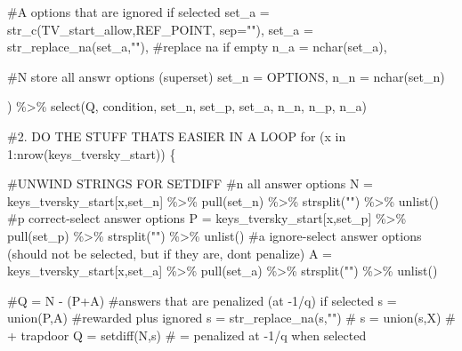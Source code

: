 \documentclass[
  letterpaper,
  DIV=11,
  numbers=noendperiod]{scrreprt}
\newenvironment{Shaded}{\begin{snugshade}}{\end{snugshade}}
\newcommand{\AttributeTok}[1]{\textcolor[rgb]{0.40,0.45,0.13}{#1}}
\newcommand{\CommentTok}[1]{\textcolor[rgb]{0.37,0.37,0.37}{#1}}
\newcommand{\ControlFlowTok}[1]{\textcolor[rgb]{0.00,0.23,0.31}{#1}}
\newcommand{\DecValTok}[1]{\textcolor[rgb]{0.68,0.00,0.00}{#1}}
\newcommand{\FunctionTok}[1]{\textcolor[rgb]{0.28,0.35,0.67}{#1}}
\newcommand{\NormalTok}[1]{\textcolor[rgb]{0.00,0.23,0.31}{#1}}
\newcommand{\OtherTok}[1]{\textcolor[rgb]{0.00,0.23,0.31}{#1}}
\newcommand{\SpecialCharTok}[1]{\textcolor[rgb]{0.37,0.37,0.37}{#1}}
\newcommand{\StringTok}[1]{\textcolor[rgb]{0.13,0.47,0.30}{#1}}
\begin{document}
\begin{Shaded}
\begin{Highlighting}[]
    \CommentTok{\#A options that are ignored if selected }
    \AttributeTok{set\_a =} \FunctionTok{str\_c}\NormalTok{(TV\_start\_allow,REF\_POINT, }\AttributeTok{sep=}\StringTok{""}\NormalTok{),}
    \AttributeTok{set\_a =} \FunctionTok{str\_replace\_na}\NormalTok{(set\_a,}\StringTok{""}\NormalTok{), }\CommentTok{\#replace na if empty}
    \AttributeTok{n\_a =} \FunctionTok{nchar}\NormalTok{(set\_a),}
    
    \CommentTok{\#N store all answr options (superset)}
    \AttributeTok{set\_n =}\NormalTok{ OPTIONS,  }
    \AttributeTok{n\_n =} \FunctionTok{nchar}\NormalTok{(set\_n)}
  
\NormalTok{) }\SpecialCharTok{\%\textgreater{}\%} \FunctionTok{select}\NormalTok{(Q, condition, set\_n, set\_p, set\_a, n\_n, n\_p, n\_a)}

\CommentTok{\#2. DO THE STUFF THAT\textquotesingle{}S EASIER IN A LOOP}
\ControlFlowTok{for}\NormalTok{ (x }\ControlFlowTok{in} \DecValTok{1}\SpecialCharTok{:}\FunctionTok{nrow}\NormalTok{(keys\_tversky\_start)) \{}
  
  \CommentTok{\#UNWIND STRINGS FOR SETDIFF}
  \CommentTok{\#n all answer options}
\NormalTok{  N }\OtherTok{=}\NormalTok{ keys\_tversky\_start[x,}\StringTok{\textquotesingle{}set\_n\textquotesingle{}}\NormalTok{] }\SpecialCharTok{\%\textgreater{}\%} \FunctionTok{pull}\NormalTok{(set\_n) }\SpecialCharTok{\%\textgreater{}\%} \FunctionTok{strsplit}\NormalTok{(}\StringTok{""}\NormalTok{) }\SpecialCharTok{\%\textgreater{}\%} \FunctionTok{unlist}\NormalTok{()}
  \CommentTok{\#p correct{-}select answer options}
\NormalTok{  P }\OtherTok{=}\NormalTok{ keys\_tversky\_start[x,}\StringTok{\textquotesingle{}set\_p\textquotesingle{}}\NormalTok{] }\SpecialCharTok{\%\textgreater{}\%} \FunctionTok{pull}\NormalTok{(set\_p) }\SpecialCharTok{\%\textgreater{}\%} \FunctionTok{strsplit}\NormalTok{(}\StringTok{""}\NormalTok{) }\SpecialCharTok{\%\textgreater{}\%} \FunctionTok{unlist}\NormalTok{()}
  \CommentTok{\#a ignore{-}select answer options (should not be selected, but if they are, don\textquotesingle{}t penalize)}
\NormalTok{  A }\OtherTok{=}\NormalTok{ keys\_tversky\_start[x,}\StringTok{\textquotesingle{}set\_a\textquotesingle{}}\NormalTok{] }\SpecialCharTok{\%\textgreater{}\%} \FunctionTok{pull}\NormalTok{(set\_a) }\SpecialCharTok{\%\textgreater{}\%} \FunctionTok{strsplit}\NormalTok{(}\StringTok{""}\NormalTok{) }\SpecialCharTok{\%\textgreater{}\%} \FunctionTok{unlist}\NormalTok{()}
  
  \CommentTok{\#Q = N {-} (P+A)}
  \CommentTok{\#answers that are penalized (at {-}1/q) if selected }
\NormalTok{  s }\OtherTok{=} \FunctionTok{union}\NormalTok{(P,A) }\CommentTok{\#rewarded plus ignored }
\NormalTok{  s }\OtherTok{=} \FunctionTok{str\_replace\_na}\NormalTok{(s,}\StringTok{""}\NormalTok{)}
  \CommentTok{\# s = union(s,X) \# + trapdoor }
\NormalTok{  Q }\OtherTok{=} \FunctionTok{setdiff}\NormalTok{(N,s) }\CommentTok{\# = penalized at {-}1/q when selected }
  

\end{Highlighting}
\end{Shaded}
\end{document}

